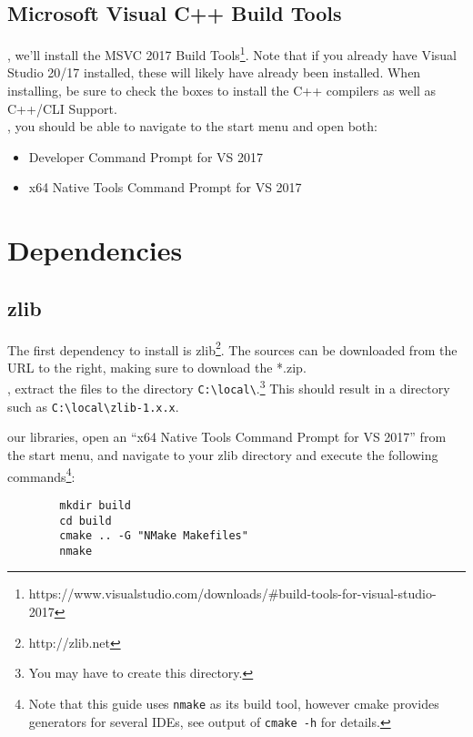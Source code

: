 \documentclass{tufte-handout}
\begin{document}
\subsection{Microsoft Visual C++ Build Tools}

, we'll install the MSVC 2017 Build
Tools\footnote{https://www.visualstudio.com/downloads/\#build-tools-for-visual-studio-2017}.
Note that if you already have Visual Studio 20/17 installed, these will likely have already
been installed.  When installing, be sure to check the boxes to install the C++ compilers as well 
as C++/CLI Support. \\ 

, you should be able to navigate to the start menu and open both:
\begin{itemize}
    
    \item Developer Command Prompt for VS 2017
    \item x64 Native Tools Command Prompt for VS 2017

\end{itemize}

\section{Dependencies}

\subsection{zlib}

The first dependency to install is zlib\footnote{http://zlib.net}.  The sources can be downloaded
from the URL to the right, making sure to download the *.zip. \\

    , extract the files to the directory \Verb|C:\local\|.\footnote{
    You may have to create this directory.}  This should result in a directory such as
    \Verb|C:\local\zlib-1.x.x|.

     our libraries, open an ``x64 Native Tools Command Prompt for VS 2017''
    from the start menu, and navigate to your zlib directory and execute the following 
    commands\footnote{Note that this guide uses \Verb|nmake| as its build tool, however cmake provides
    generators for several IDEs, see output of \Verb|cmake -h| for details.}:

    \begin{lstlisting}
        mkdir build
        cd build 
        cmake .. -G "NMake Makefiles"
        nmake
    \end{lstlisting}
\end{document}
